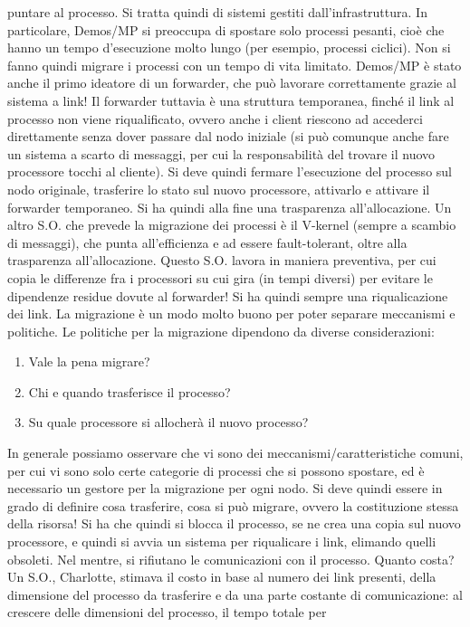 puntare al processo. Si tratta quindi di sistemi gestiti dall'infrastruttura.
In particolare, Demos/MP si preoccupa di spostare solo processi pesanti, cioè che hanno un tempo d'esecuzione molto 
lungo (per esempio, processi ciclici).
Non si fanno quindi migrare i processi con un tempo di vita limitato.
Demos/MP è stato anche il primo ideatore di un forwarder, che può lavorare correttamente grazie al sistema a link! Il 
forwarder tuttavia è una struttura temporanea, finché il link al processo non viene riqualificato, ovvero anche i
client riescono ad accederci direttamente senza dover passare dal nodo iniziale (si può comunque anche fare un sistema a 
scarto di messaggi, per cui la responsabilità del trovare il nuovo processore tocchi al cliente). Si deve quindi
fermare l'esecuzione del processo sul nodo originale, trasferire lo stato sul nuovo processore, attivarlo e attivare il 
forwarder temporaneo. Si ha quindi alla fine una trasparenza all'allocazione.
Un altro S.O. che prevede la migrazione dei processi è il V-kernel (sempre a scambio di messaggi), che punta 
all'efficienza e ad essere fault-tolerant, oltre alla trasparenza all'allocazione. Questo S.O. lavora in maniera 
preventiva, per cui copia le differenze fra i processori su cui gira (in tempi diversi) per evitare le dipendenze 
residue dovute al forwarder! Si ha quindi sempre una riqualicazione dei link.
La migrazione è un modo molto buono per poter separare meccanismi e politiche. Le politiche per la migrazione dipendono 
da diverse considerazioni:
\begin{enumerate}
 \item Vale la pena migrare?
 \item Chi e quando trasferisce il processo?
 \item Su quale processore si allocherà il nuovo processo?
\end{enumerate}
In generale possiamo osservare che vi sono dei meccanismi/caratteristiche comuni, per cui vi sono solo certe categorie
di processi che si possono spostare, ed è necessario un gestore per la migrazione per ogni nodo. Si deve quindi essere 
in grado di definire cosa trasferire, cosa si può migrare, ovvero la costituzione stessa della risorsa! Si ha che quindi 
si blocca il processo, se ne crea una copia sul nuovo processore, e quindi si avvia un sistema per riqualicare i link, 
elimando quelli obsoleti. Nel mentre, si rifiutano le comunicazioni con il processo.
Quanto costa? Un S.O., Charlotte, stimava il costo in base al numero dei link presenti, della dimensione del processo da 
trasferire e da una parte costante di comunicazione: al crescere delle dimensioni del processo, il tempo totale per
